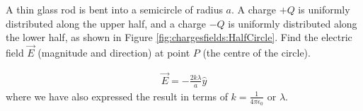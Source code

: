 \question A thin glass rod is bent into a semicircle of radius $a$. A charge $+Q$ is uniformly distributed along the upper half, and a charge $-Q$ is uniformly distributed along the lower half, as shown in Figure \ref{fig:chargesfields:HalfCircle}. Find the electric field $\vec E$ (magnitude and direction) at point $P$ (the centre of the circle).
\begin{finalanswer}
\begin{align*}
\vec E=-\frac{2k\lambda}{a}\hat y
\end{align*}
where we have also expressed the result in terms of $k=\frac{1}{4\pi\epsilon_0}$ or $\lambda$.
\end{finalanswer}
